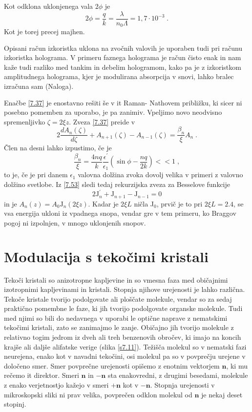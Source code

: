 Kot odklona uklonjenega vala $2\phi$ je 
\begin{equation}
2\phi=\frac{q}{k}=\frac{\lambda}{n_{0}\Lambda}=1,7\cdot10^{-3}\;.\label{7.52}
\end{equation}
 Kot je torej precej majhen.

Opisani račun izkoristka uklona na zvočnih valovih je uporaben tudi
pri računu izkoristka holograma. V primeru faznega holograma je račun
čisto enak in nam kaže tudi razliko med tankim in debelim hologramom,
kako pa je z izkoristkom amplitudnega holograma, kjer je modulirana
absorpcija v snovi, lahko bralec izračuna sam (Naloga).

Enačbe \ref{7.37} je enostavno rešiti še v {it Raman- Nathovem približku},
ki sicer ni posebno pomemben za uporabo, je pa zanimiv. Vpeljimo novo
neodvisno spremenljivko $\zeta=2\xi z$. Zveza \ref{7.37} preide
v 
\begin{equation}
2\frac{dA_{n}(\zeta)}{d\zeta}+A_{n+1}(\zeta)-A_{n-1}(\zeta)=\frac{\beta_{n}}{\xi}A_{n}\;.\label{7.53}
\end{equation}
 Člen na desni lahko izpustimo, če je 
\begin{equation}
\frac{\beta_{n}}{\xi}=\frac{4nq}{k}\frac{\epsilon^{\prime}}{\epsilon_{1}}(\sin\phi-\frac{nq}{2k})<<1\;,\label{7.54}
\end{equation}
 to je, če je pri danem $\epsilon_{1}$ valovna dolžina zvoka dovolj
velika v primeri z valovno dolžino svetlobe. Iz \ref{7.53} sledi
tedaj rekurzijska zveza za Besselove funkcije 
\begin{equation}
2\mbox{J}_{n}^{\prime}+\mbox{J}_{n+1}-\mbox{J}_{n-1}=0\label{7.55}
\end{equation}
 in je $A_{n}(z)=A_{0}\mbox{J}_{n}(2\xi z)$. Kadar je $2\xi L$ ničla
J$_{0}$, prvič je to pri $2\xi L=2.4$, se vsa energija ukloni iz
vpadnega snopa, vendar gre v tem primeru, ko Braggov pogoj ni izpolnjen,
v mnogo uklonjenih snopov.

\section{Modulacija s tekočimi kristali}

Tekoči kristali so anizotropne kapljevine in so vmesna faza med običajnimi
izotropnimi kapljevinami in kristali. Stopnja njihove urejenosti je
lahko različna. Tekoče kristale tvorijo podolgovate ali ploščate molekule,
vendar so za sedaj praktično pomembne le faze, ki jih tvorijo podolgovate
organske molekule. Tudi med njimi so bili do nedavnega v uporabi le
optične naprave z nematskimi tekočimi kristali, zato se zanimajmo
le zanje. Običajno jih tvorijo molekule z relativno togim jedrom iz
dveh ali treh benzenovih obročev, ki imajo na koncih krajše ali daljše
alifatske verige (slika \ref{s7.11}). Težišča molekul so v nematski
fazi neurejena, enako kot v navadni tekočini, osi molekul pa so v
povprečju urejene v določeno smer. Smer povprečne urejenosti opišemo
z enotnim vektorjem $\mathbf{n}$, ki mu rečemo {it direktor}. Smeri
$\mathbf{n}$ in $-\mathbf{n}$ sta enakovredni, z drugimi besedami, molekule
z enako verjetnostjo kažejo v smeri $+\mathbf{n}$ kot v $-\mathbf{n}$.
Stopnja urejenosti v mikroskopski sliki ni prav velika, povprečen
odklon molekul od $\mathbf{n}$ je nekaj deset stopinj.

